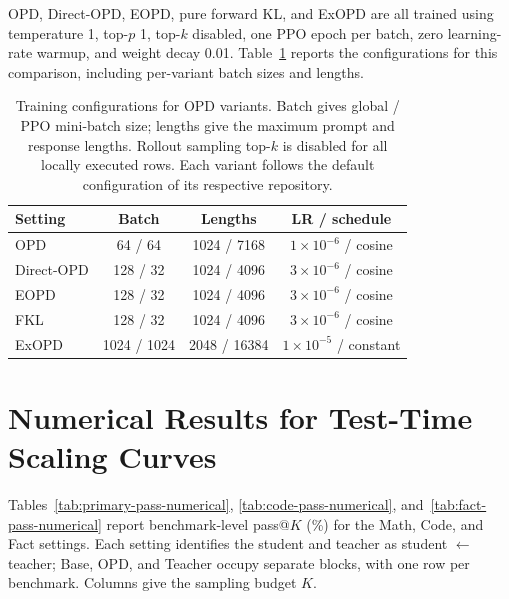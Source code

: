 \documentclass{article}
\theoremstyle{opdplain}
\begin{document}
OPD, Direct-OPD, EOPD, pure forward KL, and ExOPD are all trained using temperature 1, top-\(p\) 1, top-\(k\) disabled, one PPO epoch per batch, zero learning-rate warmup, and weight decay 0.01. Table~\ref{tab:training-hyperparameters} reports the configurations for this comparison, including per-variant batch sizes and lengths.

\begin{table}[!ht]
\centering
\setlength{\tabcolsep}{2pt}
\renewcommand{\arraystretch}{1}
\caption{Training configurations for OPD variants. Batch gives global / PPO
mini-batch size; lengths give the maximum prompt and response lengths. Rollout sampling
top-$k$ is disabled for all locally executed rows. Each variant follows the
default configuration of its respective repository.}
\label{tab:training-hyperparameters}
\vspace{-8.5pt}
\fontsize{6.93}{7.7}\selectfont
\begin{tabular}{@{}l|ccc@{}}
\toprule[1.6pt]
\textbf{Setting} & \textbf{Batch} & \textbf{Lengths} & \textbf{LR / schedule} \\
\midrule
OPD \citep{li2026rethinkingopd}
& 64 / 64
& 1024 / 7168
& \(1{\times}10^{-6}\) / cosine \\
Direct-OPD \citep{feng2026directopd}
& 128 / 32
& 1024 / 4096
& \(3{\times}10^{-6}\) / cosine \\
EOPD \citep{jin2026entropyopd}
& 128 / 32
& 1024 / 4096
& \(3{\times}10^{-6}\) / cosine \\
FKL
& 128 / 32
& 1024 / 4096
& \(3{\times}10^{-6}\) / cosine \\
ExOPD \citep{yang2026exopd}
& 1024 / 1024
& 2048 / 16384
& \(1{\times}10^{-5}\) / constant \\
\bottomrule[1.6pt]
\end{tabular}
\end{table}

\section{Numerical Results for Test-Time Scaling Curves}

Tables~\ref{tab:primary-pass-numerical}, \ref{tab:code-pass-numerical}, and~\ref{tab:fact-pass-numerical} report benchmark-level pass@$K$ (\%) for the Math, Code, and Fact settings. Each setting identifies the student and teacher as student $\leftarrow$ teacher; Base, OPD, and Teacher occupy separate blocks, with one row per benchmark. Columns give the sampling budget $K$.
\end{document}
